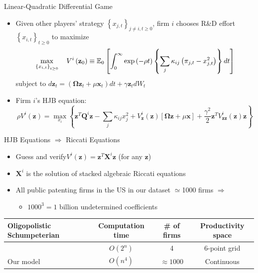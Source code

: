 \documentclass[english,aspectratio=169,handout]{beamer}
\theoremstyle{plain}
\newcommand{\mat}[1]{\bm{#1}}
\newcommand{\vect}[1]{\mathbf{#1}}
\begin{document}
\begin{frame}{Linear-Quadratic Differential Game}

  \vspace{-1mm}

  \begin{itemize}
    \item Given other players' strategy $\left\{ x_{j,t}\right\} _{j\neq i,t\geq0}$,
          firm $i$ chooses R\&D effort $\left\{ x_{i,t}\right\} _{t\geq0}$
          to maximize
          \[
            \max_{\left\{ x_{i,t}\right\} _{t\geq0}}\quad V^{i}\left(\text{\ensuremath{\vect{z}}}_{0}\right)\equiv\mathbb{E}_{0}\left[\int_{0}^{\infty}\exp\left(-\rho t\right)\left\{ \sum_{j}\kappa_{ij}\left(\pi_{j,t}-x_{j,t}^{2}\right)\right\} dt\right]
          \]
          subject to $d\vect{z}_{t}=\left(\mat{\Omega}\vect{z}_{t}+\mu\vect{x}_{t}\right)dt+\gamma\vect{z}_{t}dW_{t}$\medskip{}
    \item Firm $i$'s HJB equation:
          \[
            \rho V^{i}\left(\vect{z}\right)=\max_{x_{i}}\left\{ \vect{z}^{T}\mat{Q}^{i}\vect{z}-\sum_{j}\kappa_{ij}x_{j}^{2}+V_{\vect{z}}^{i}\left(\vect{z}\right)\left[\mat{\Omega}\vect{z}+\mu\vect{x}\right]+\frac{\gamma^{2}}{2}\vect{z}^{T}V_{\vect{zz}}^{i}\left(\vect{z}\right)\vect{z}\right\}
          \]
  \end{itemize}
\end{frame}
%
\begin{frame}{HJB Equations $\Longrightarrow$ Riccati Equations}

  \label{hjb}
  \begin{itemize}
    \item Guess and verify$V^{i}\left(\vect{z}\right)=\vect{z}^{T}\mat{X}^{i}\vect{z}$
          (for any $\vect{z}$)
    \item $\mat{X}^{i}$ is the solution of stacked algebraic Riccati equations \hyperlink{riccati}{}
    \item All public patenting firms in the US in our dataset $\simeq$1000
          firms $\Longrightarrow$
          \begin{itemize}
            \item $1000^{3}=1$ billion undetermined coefficients\medskip{}
          \end{itemize}
  \end{itemize}
  \begin{center}
    \begin{tabular}{@{}p{5cm}ccc@{}}
      \toprule
      Oligopolistic Schumpeterian                                       & Computation time & \# of firms    & Productivity space \\
      \midrule
      \citet{Cavenaile2023-lo}                    & $O(2^n)$         & 4              & 6-point grid       \\
      Our model                                   & $O(n^4)$         & $\approx1000$  & Continuous         \\
      \bottomrule
    \end{tabular}
  \end{center}

\end{frame}
\end{document}
